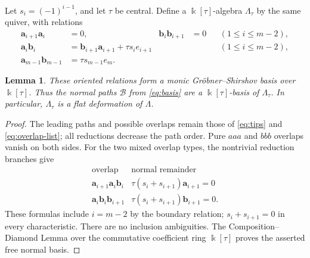 \documentclass[a4paper,11pt,oneside,reqno]{amsart}
\newtheorem{lemma}[theorem]{Lemma}
\theoremstyle{definition}
\numberwithin{equation}{section}
\begin{document}
Let $s_i=(-1)^{i-1}$, and let $\tau$ be central.  Define a
$\Bbbk[\tau]$-algebra $\Lambda_\tau$ by the same quiver, with relations
\begin{align}
 \mathbf a_{i+1}\mathbf a_i&=0,
 &\mathbf b_i\mathbf b_{i+1}&=0 &&(1\le i\le m-2),
 \label{gerst:deformation-pure}\\
 \mathbf a_i\mathbf b_i
 &=\mathbf b_{i+1}\mathbf a_{i+1}+\tau s_i e_{i+1}
 &&&&(1\le i\le m-2),
 \label{gerst:deformation-interior}\\
 \mathbf a_{m-1}\mathbf b_{m-1}&=\tau s_{m-1}e_m.
 \label{gerst:deformation-boundary}
\end{align}

\begin{lemma}\label{gerst:flat-family}
These oriented relations form a monic Gr\"obner--Shirshov basis
over $\Bbbk[\tau]$.  Thus the normal paths $\mathcal B$ from
\eqref{eq:basis} are a $\Bbbk[\tau]$-basis of $\Lambda_\tau$.
In particular, $\Lambda_\tau$ is a flat deformation of $\Lambda$.
\end{lemma}

\begin{proof}
The leading paths and possible overlaps remain those of
\eqref{eq:tips} and \eqref{eq:overlap-list}; all reductions decrease
the path order.  Pure $aaa$ and $bbb$ overlaps vanish on both sides.
For the two mixed overlap types, the nontrivial reduction branches
give
\[
\begin{array}{c|c}
 \text{overlap}&\text{normal remainder}\\\hline
 \mathbf a_{i+1}\mathbf a_i\mathbf b_i
 &\tau(s_i+s_{i+1})\mathbf a_{i+1}=0\\
 \mathbf a_i\mathbf b_i\mathbf b_{i+1}
 &\tau(s_i+s_{i+1})\mathbf b_{i+1}=0.
\end{array}
\]
These formulas include $i=m-2$ by the boundary relation;
$s_i+s_{i+1}=0$ in every characteristic.  There are no inclusion
ambiguities.  The Composition--Diamond Lemma over the commutative
coefficient ring $\Bbbk[\tau]$ proves the asserted free normal basis.
\end{proof}
\end{document}
